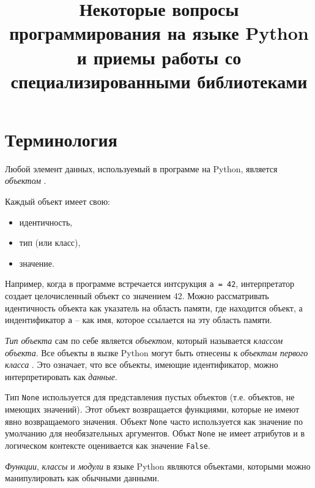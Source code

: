 \documentclass[%
	11pt,
	a4paper,
	utf8,
		]{article}
\begin{document}
\title{Некоторые вопросы программирования на языке Python и приемы работы со специализированными библиотеками}

\author{}

\date{}
\maketitle

\thispagestyle{fancy}

\tableofcontents

\section{Терминология}

Любой элемент данных, используемый в программе на Python, является \emph{объектом} \cite[]{beazley:python-2010}.

Каждый объект имеет свою:
\begin{itemize}
	\item идентичность,
	
	\item тип (или класс),
	
	\item значение.
\end{itemize}

Например, когда в программе встречается интсрукция \verb|a = 42|, интерпретатор создает целочисленный объект со значением 42. Можно рассматривать идентичность объекта как указатель на область памяти, где находится объект, а индентификатор \texttt{a} -- как имя, которое ссылается на эту область памяти.

\emph{Тип объекта} сам по себе является \emph{объектом}, который называется \emph{классом объекта}. Все объекты в яызке Python могут быть отнесены к \emph{объектам первого класса} \cite[]{beazley:python-2010}. Это означает, что все объекты, имеющие идентификатор, можно интерпретировать как \emph{данные}.

Тип \texttt{None} используется для представления пустых объектов (т.е. объектов, не имеющих значений). Этот объект возвращается функциями, которые не имеют явно возвращаемого значения. Объект \texttt{None} часто используется как значение по умолчанию для необязательных аргументов. Объкт \texttt{None} не имеет атрибутов и в логическом контексте оценивается как значение \texttt{False}.

\emph{Функции}, \emph{классы} и \emph{модули} в языке Python являются объектами, которыми можно манипулировать как обычными данными.
\end{document}
